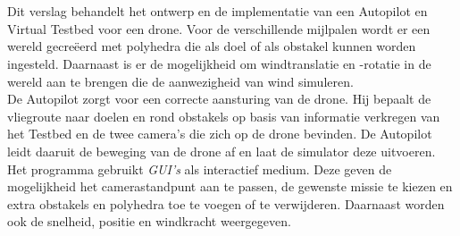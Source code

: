 \\\\
Dit verslag behandelt het ontwerp en de implementatie van een Autopilot en Virtual Testbed voor een drone. Voor de verschillende mijlpalen wordt er een wereld gecre\"eerd met polyhedra die als doel of als obstakel kunnen worden ingesteld. Daarnaast is er de mogelijkheid om windtranslatie en -rotatie in de wereld aan te brengen die de aanwezigheid van wind simuleren. \\
De Autopilot zorgt voor een correcte aansturing van de drone. Hij bepaalt de vliegroute naar doelen en rond obstakels op basis van informatie verkregen van het Testbed en de twee camera's die zich op de drone bevinden. De Autopilot leidt daaruit de beweging van de drone af en laat de simulator deze uitvoeren.\\
Het programma gebruikt \textit{GUI's} als interactief medium. Deze geven de mogelijkheid het camerastandpunt aan te passen, de gewenste missie te kiezen en extra obstakels en polyhedra toe te voegen of te verwijderen. Daarnaast worden ook de snelheid, positie en windkracht weergegeven.
\\\\
\\\\